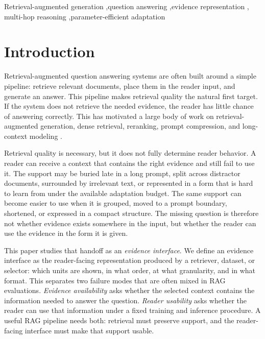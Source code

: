 \documentclass[a4paper,fleqn]{cas-sc}
\begin{document}
\begin{keywords}
Retrieval-augmented generation \sep question answering \sep evidence representation \sep
multi-hop reasoning \sep parameter-efficient adaptation
\end{keywords}

\maketitle

\section{Introduction}

Retrieval-augmented question answering systems are often built around a simple
pipeline: retrieve relevant documents, place them in the reader input, and
generate an answer. This pipeline makes retrieval quality the natural first
target. If the system does not retrieve the needed evidence, the reader has
little chance of answering correctly. This has motivated a large body of work
on retrieval-augmented generation, dense retrieval, reranking, prompt
compression, and long-context modeling
\citep{lewis2020rag,karpukhin2020dpr,khattab2020colbert,xu2023recomp,jiang2023longllmlingua,liu2023lost}.

Retrieval quality is necessary, but it does not fully determine reader
behavior. A reader can receive a context that contains the right evidence and
still fail to use it. The support may be buried late in a long prompt, split
across distractor documents, surrounded by irrelevant text, or represented in a
form that is hard to learn from under the available adaptation budget. The same
support can become easier to use when it is grouped, moved to a prompt
boundary, shortened, or expressed in a compact structure. The missing question
is therefore not whether evidence exists somewhere in the input, but whether
the reader can use the evidence in the form it is given.

This paper studies that handoff as an \emph{evidence interface}. We define an
evidence interface as the reader-facing representation produced by a retriever,
dataset, or selector: which units are shown, in what order, at what
granularity, and in what format. This separates two failure modes that are
often mixed in RAG evaluations. \emph{Evidence availability} asks whether the
selected context contains the information needed to answer the question.
\emph{Reader usability} asks whether the reader can use that information under
a fixed training and inference procedure. A useful RAG pipeline needs both:
retrieval must preserve support, and the reader-facing interface must make that
support usable.
\end{document}
